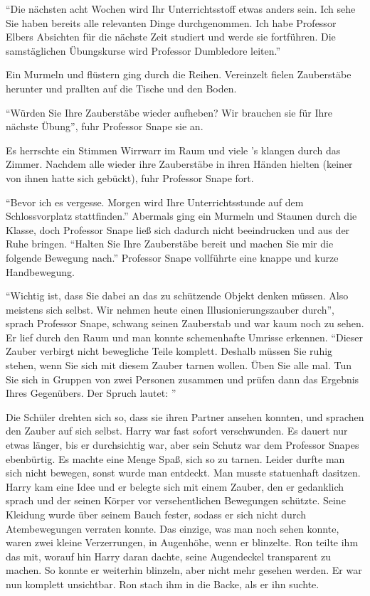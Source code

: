 \enquote{Die nächsten acht Wochen wird Ihr Unterrichtsstoff etwas anders sein. Ich sehe Sie haben bereits alle relevanten Dinge durchgenommen. Ich habe Professor Elbers Absichten für die nächste Zeit studiert und werde sie fortführen. Die samstäglichen Übungskurse wird Professor Dumbledore leiten.}

Ein Murmeln und flüstern ging durch die Reihen. Vereinzelt fielen Zauberstäbe herunter und prallten auf die Tische und den Boden.

\enquote{Würden Sie Ihre Zauberstäbe wieder aufheben? Wir brauchen sie für Ihre nächste Übung}, fuhr Professor Snape sie an.

Es herrschte ein Stimmen Wirrwarr im Raum und viele 's klangen durch das Zimmer. Nachdem alle wieder ihre Zauberstäbe in ihren Händen hielten (keiner von ihnen hatte sich gebückt), fuhr Professor Snape fort.

\enquote{Bevor ich es vergesse. Morgen wird Ihre Unterrichtsstunde auf dem Schlossvorplatz stattfinden.} Abermals ging ein Murmeln und Staunen durch die Klasse, doch Professor Snape ließ sich dadurch nicht beeindrucken und aus der Ruhe bringen. \enquote{Halten Sie Ihre Zauberstäbe bereit und machen Sie mir die folgende Bewegung nach.} Professor Snape vollführte eine knappe und kurze Handbewegung.

\enquote{Wichtig ist, dass Sie dabei an das zu schützende Objekt denken müssen. Also meistens sich selbst. Wir nehmen heute einen Illusionierungszauber durch}, sprach Professor Snape, schwang seinen Zauberstab und war kaum noch zu sehen. Er lief durch den Raum und man konnte schemenhafte Umrisse erkennen. \enquote{Dieser Zauber verbirgt nicht bewegliche Teile komplett. Deshalb müssen Sie ruhig stehen, wenn Sie sich mit diesem Zauber tarnen wollen. Üben Sie alle mal. Tun Sie sich in Gruppen von zwei Personen zusammen und prüfen dann das Ergebnis Ihres Gegenübers. Der Spruch lautet: }

Die Schüler drehten sich so, dass sie ihren Partner ansehen konnten, und sprachen den Zauber auf sich selbst. Harry war fast sofort verschwunden. Es dauert nur etwas länger, bis er durchsichtig war, aber sein Schutz war dem Professor Snapes ebenbürtig. Es machte eine Menge Spaß, sich so zu tarnen. Leider durfte man sich nicht bewegen, sonst wurde man entdeckt. Man musste statuenhaft dasitzen. Harry kam eine Idee und er belegte sich mit einem Zauber, den er gedanklich sprach und der seinen Körper vor versehentlichen Bewegungen schützte. Seine Kleidung wurde über seinem Bauch fester, sodass er sich nicht durch Atembewegungen verraten konnte. Das einzige, was man noch sehen konnte, waren zwei kleine Verzerrungen, in Augenhöhe, wenn er blinzelte. Ron teilte ihm das mit, worauf hin Harry daran dachte, seine Augendeckel transparent zu machen. So konnte er weiterhin blinzeln, aber nicht mehr gesehen werden. Er war nun komplett unsichtbar. Ron stach ihm in die Backe, als er ihn suchte.

